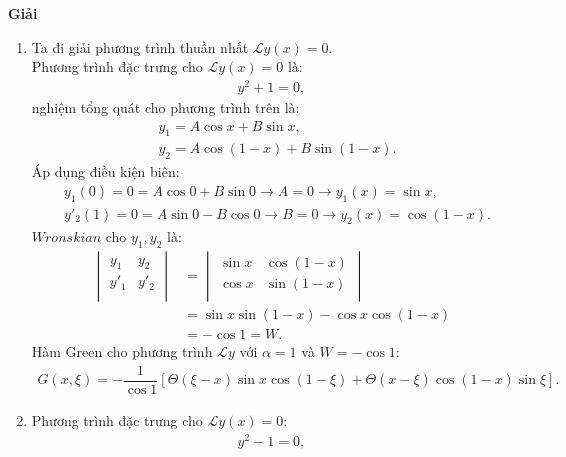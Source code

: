 \documentclass{report}
\newcommand{\f}[2]{\dfrac{#1}{#2}}
\begin{document}
\textbf{Giải}\\
\begin{enumerate}[label=(\alph*)]
	\item Ta đi giải phương trình thuần nhất $\mathcal{L} y(x) = 0$. \\
	      Phương trình đặc trưng cho $\mathcal{L} y(x) = 0$ là:
	      \begin{align*}
		      y^2 + 1 = 0 ,
	      \end{align*}
	      nghiệm tổng quát cho phương trình trên là:
	      \begin{align*}
		       & y_{1} = A \cos x + B \sin x,         \\
		       & y_{2} = A \cos (1-x) + B \sin (1-x).
	      \end{align*}
	      Áp dụng điều kiện biên:
	      \begin{align*}
		       & y_{1}(0) = 0 = A \cos 0 + B \sin 0 \rightarrow A = 0 \rightarrow y_{1}(x) = \sin x ,     \\
		       & y'_{2}(1) = 0 = A \sin 0 - B \cos 0 \rightarrow B = 0 \rightarrow y_{2}(x) = \cos (1-x).
	      \end{align*}
	      $Wronskian$ cho $y_1,y_2$ là:
	      \begin{align*}
		      \begin{vmatrix}
			      y_1  & y_2  \\
			      y'_1 & y'_2 \\
		      \end{vmatrix}
		       & =
		      \begin{vmatrix}
			      \sin x & \cos (1-x) \\
			      \cos x & \sin (1-x) \\
		      \end{vmatrix}                       \\
		       & = \sin x \sin(1-x) - \cos x \cos (1-x) \\
		       & = -\cos 1 = W.
	      \end{align*}
	      Hàm Green cho phương trình $\mathcal{L} y$ với $\alpha = 1$ và $W = -\cos 1$:
	      \begin{align*}
		      G(x,\xi) = -\f{1}{\cos 1} \left[ \Theta(\xi - x) \sin x \cos(1-\xi) + \Theta(x - \xi) \cos(1-x)\sin \xi \right].
	      \end{align*}
	\item  Phương trình đặc trưng cho $\mathcal{L} y(x) = 0$:
	      \begin{align*}
		      y^2 - 1 = 0,
	      \end{align*}

\end{enumerate}
\end{document}
